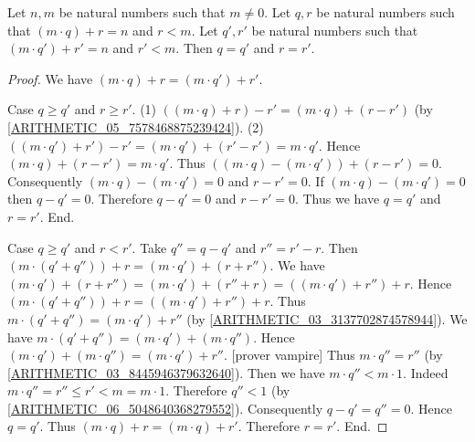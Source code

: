 \documentclass[../arithmetic.tex]{subfiles}
\begin{document}
  \begin{forthel}
    \begin{proposition}
      Let $n, m$ be natural numbers such that $m \neq 0$.
      Let $q, r$ be natural numbers such that $(m \cdot q) \plus r = n$ and $r \less m$.
      Let $q', r'$ be natural numbers such that $(m \cdot q') \plus r' = n$ and
      $r' \less m$.
      Then $q = q'$ and $r = r'$.
    \end{proposition}
    \begin{proof}
      We have $(m \cdot q) \plus r = (m \cdot q') \plus r'$.

      Case $q \geq q'$ and $r \geq r'$.
        (1) $((m \cdot q) \plus r) \minus r' = (m \cdot q) \plus (r \minus r')$
        (by \cref{ARITHMETIC_05_7578468875239424}).
        (2) $((m \cdot q') \plus r') \minus r'
          = (m \cdot q') \plus (r' \minus r')
          = m \cdot q'$.
        Hence $(m \cdot q) \plus (r \minus r') = m \cdot q'$.
        Thus $((m \cdot q) \minus (m \cdot q')) \plus (r \minus r') = 0$.
        Consequently $(m \cdot q) \minus (m \cdot q') = 0$ and $r \minus r' = 0$.
        If $(m \cdot q) \minus (m \cdot q') = 0$ then $q \minus q' = 0$.
        Therefore $q \minus q' = 0$ and $r \minus r' = 0$.
        Thus we have $q = q'$ and $r = r'$.
      End.

      Case $q \geq q'$ and $r \less r'$.
        Take $q'' = q \minus q'$ and $r'' = r' \minus r$.
        Then $(m \cdot (q' \plus q'')) \plus r = (m \cdot q') \plus (r \plus r'')$.
        We have $(m \cdot q') \plus (r \plus r'')
          = (m \cdot q') \plus (r'' \plus r)
          = ((m \cdot q') \plus r'') \plus r$.
        Hence $(m \cdot (q' \plus q'')) \plus r = ((m \cdot q') \plus r'') \plus r$.
        Thus $m \cdot (q' \plus q'') = (m \cdot q') \plus r''$
        (by \cref{ARITHMETIC_03_3137702874578944}).
        We have $m \cdot (q' \plus q'') = (m \cdot q') \plus (m \cdot q'')$.
        Hence $(m \cdot q') \plus (m \cdot q'') = (m \cdot q') \plus r''$.
        [prover vampire]
        Thus $m \cdot q'' = r''$ (by \cref{ARITHMETIC_03_8445946379632640}).
        Then we have $m \cdot q'' \less m \cdot 1$.
        Indeed $m \cdot q''
          = r''
          \leq r'
          \less m
          = m \cdot 1$.
        Therefore $q'' \less 1$ (by \cref{ARITHMETIC_06_5048640368279552}).
        Consequently $q \minus q' = q'' = 0$.
        Hence $q = q'$.
        Thus $(m \cdot q) \plus r = (m \cdot q) \plus r'$.
        Therefore $r = r'$.
      End.


\end{proof}
\end{forthel}
\end{document}

